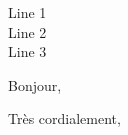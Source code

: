 \documentclass[
    sender,
    paper=a4,
    version=last,
    fontsize=11pt,
    DIV=13,
    BCOR=0mm]{scrlttr2}
\begin{document}

\begin{letter}{
  Line 1 \\
  Line 2 \\
  Line 3 \\
}

\opening{Bonjour,}



\closing{Très cordialement,}

\end{letter}
\end{document}
